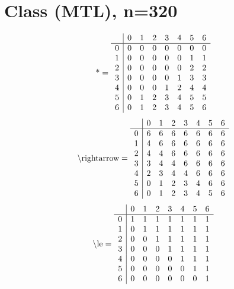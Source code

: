 \documentclass[11pt]{article}
\begin{document}
\section{Class (MTL), n=320}
\[\text{*} = 
\begin{array}{r | r r r r r r r}
 & 0 & 1 & 2 & 3 & 4 & 5 & 6 \\ \hline
0 & 0 & 0 & 0 & 0 & 0 & 0 & 0 \\
1 & 0 & 0 & 0 & 0 & 0 & 1 & 1 \\
2 & 0 & 0 & 0 & 0 & 0 & 2 & 2 \\
3 & 0 & 0 & 0 & 0 & 1 & 3 & 3 \\
4 & 0 & 0 & 0 & 1 & 2 & 4 & 4 \\
5 & 0 & 1 & 2 & 3 & 4 & 5 & 5 \\
6 & 0 & 1 & 2 & 3 & 4 & 5 & 6 \\
\end{array}
\]
\[\text{\textbackslash rightarrow} = 
\begin{array}{r | r r r r r r r}
 & 0 & 1 & 2 & 3 & 4 & 5 & 6 \\ \hline
0 & 6 & 6 & 6 & 6 & 6 & 6 & 6 \\
1 & 4 & 6 & 6 & 6 & 6 & 6 & 6 \\
2 & 4 & 4 & 6 & 6 & 6 & 6 & 6 \\
3 & 3 & 4 & 4 & 6 & 6 & 6 & 6 \\
4 & 2 & 3 & 4 & 4 & 6 & 6 & 6 \\
5 & 0 & 1 & 2 & 3 & 4 & 6 & 6 \\
6 & 0 & 1 & 2 & 3 & 4 & 5 & 6 \\
\end{array}
\]
\[\text{\textbackslash le} = 
\begin{array}{r | r r r r r r r}
 & 0 & 1 & 2 & 3 & 4 & 5 & 6 \\ \hline
0 & 1 & 1 & 1 & 1 & 1 & 1 & 1 \\
1 & 0 & 1 & 1 & 1 & 1 & 1 & 1 \\
2 & 0 & 0 & 1 & 1 & 1 & 1 & 1 \\
3 & 0 & 0 & 0 & 1 & 1 & 1 & 1 \\
4 & 0 & 0 & 0 & 0 & 1 & 1 & 1 \\
5 & 0 & 0 & 0 & 0 & 0 & 1 & 1 \\
6 & 0 & 0 & 0 & 0 & 0 & 0 & 1 \\
\end{array}
\]
\end{document}
